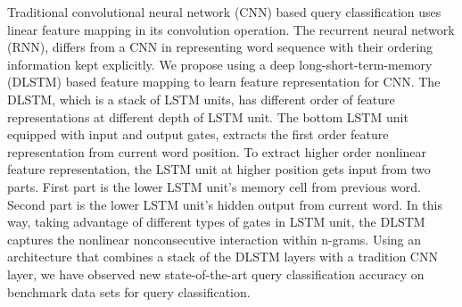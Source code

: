 Traditional convolutional neural network (CNN) based query classification uses linear feature mapping in its convolution operation. The recurrent neural network (RNN), differs from a CNN in representing word sequence with their ordering information kept explicitly. We propose using a deep long-short-term-memory (DLSTM) based feature mapping to learn feature representation for CNN. The DLSTM, which is a stack of LSTM units, has different order of feature representations at different depth of LSTM unit. The bottom LSTM unit equipped with input and output gates, extracts the first order feature representation from current word position. To extract higher order nonlinear feature representation, the LSTM unit at higher position gets input from two parts. First part is the lower LSTM unit's memory cell from previous word. Second part is the lower LSTM unit's hidden output from current word. In this way, taking advantage of different types of gates in LSTM unit, the DLSTM captures the nonlinear nonconsecutive interaction within n-grams. Using an architecture that combines a stack of the DLSTM layers with a tradition CNN layer, we have observed new state-of-the-art query classification accuracy on benchmark data sets for query classification.
